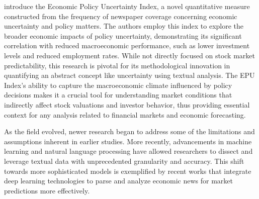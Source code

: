 \mx
\cite{baker2016measuring}
introduce the Economic Policy Uncertainty Index, a novel quantitative measure constructed from the frequency of newspaper coverage concerning economic uncertainty and policy matters. The authors employ this index to explore the broader economic impacts of policy uncertainty, demonstrating its significant correlation with reduced macroeconomic performance, such as lower investment levels and reduced employment rates. While not directly focused on stock market predictability, this research is pivotal for its methodological innovation in quantifying an abstract concept like uncertainty using textual analysis. The EPU Index's ability to capture the macroeconomic climate influenced by policy decisions makes it a crucial tool for understanding market conditions that indirectly affect stock valuations and investor behavior, thus providing essential context for any analysis related to financial markets and economic forecasting.


As the field evolved, newer research began to address some of the limitations and assumptions inherent in earlier studies. More recently, advancements in machine learning and natural language processing have allowed researchers to dissect and leverage textual data with unprecedented granularity and accuracy. This shift towards more sophisticated models is exemplified by recent works that integrate deep learning technologies to parse and analyze economic news for market predictions more effectively.

\mx 

